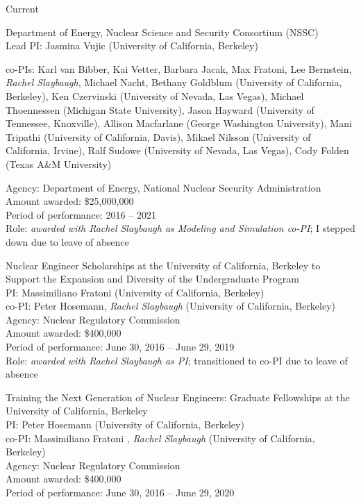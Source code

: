 \begin{rSubsection}{Current}{}{}{}
\vspace*{0.3 em}
\item Department of Energy, Nuclear Science and Security Consortium (NSSC)\\
Lead PI: Jasmina Vujic (University of California, Berkeley)
\vspace*{-.6 em}
\begin{addmargin}[1em]{0 em}
co-PIs: Karl van Bibber, Kai Vetter, Barbara Jacak, Max Fratoni, Lee Bernstein, \textit{Rachel Slaybaugh}, Michael Nacht, Bethany Goldblum (University of California, Berkeley), Ken Czervinski (University of Nevada, Las Vegas), Michael Thoennessen (Michigan State University), Jason Hayward (University of Tennessee, Knoxville), Allison Macfarlane (George Washington University), Mani Tripathi (University of California, Davis), Mikael Nilsson (University of California, Irvine), Ralf Sudowe (University of Nevada, Las Vegas), Cody Folden (Texas A\&M University)
\end{addmargin}
\vspace*{-.6 em}
Agency:  Department of Energy, National Nuclear Security Administration\\
Amount awarded: \$25,000,000\\
Period of performance: 2016 -- 2021\\
Role: \textit{awarded with Rachel Slaybaugh as Modeling and Simulation co-PI}; I stepped down due to leave of absence

\vspace*{0.3 em}
\item Nuclear Engineer Scholarships at the University of California, Berkeley to Support the Expansion and Diversity of the Undergraduate Program	\\
PI: Massimiliano Fratoni (University of California, Berkeley) \\
\hspace*{1 em} co-PI: Peter Hosemann, \textit{Rachel Slaybaugh} (University of California, Berkeley)\\
Agency: Nuclear Regulatory Commission \\
Amount awarded: \$400,000\\
Period of performance: June 30, 2016 -- June 29, 2019\\
Role: \textit{awarded with Rachel Slaybaugh as PI}; transitioned to co-PI due to leave of absence

\vspace*{0.3 em}
\item Training the Next Generation of Nuclear Engineers: Graduate Fellowships at the University of California, Berkeley	\\
PI: Peter Hosemann (University of California, Berkeley) \\
\hspace*{1 em} co-PI: Massimiliano Fratoni , \textit{Rachel Slaybaugh} (University of California, Berkeley)\\
Agency: Nuclear Regulatory Commission \\
Amount awarded: \$400,000\\
Period of performance: June 30, 2016 -- June 29, 2020
\end{rSubsection}

